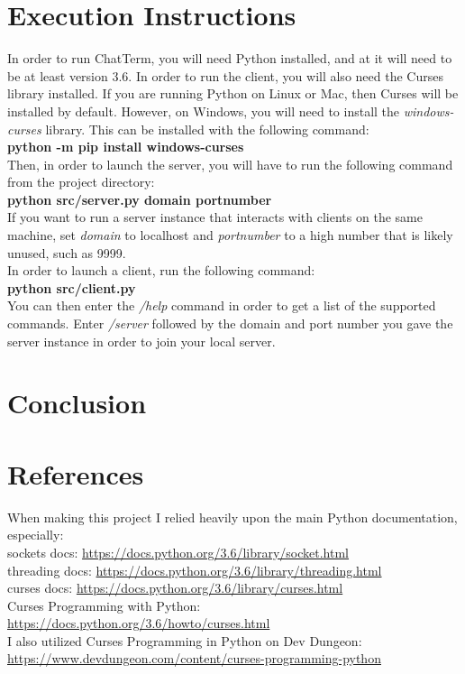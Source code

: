 \documentclass{article}
\begin{document}
    \section{Execution Instructions} 
    In order to run ChatTerm, you will need Python installed, and at it will
    need to be at least version 3.6. In order to run the client, you will also
    need the Curses library installed. If you are running Python on Linux or
    Mac, then Curses will be installed by default. However, on Windows, you will
    need to install the \emph{windows-curses} library. This can be installed
    with the following command:\\
    \textbf{python -m pip install windows-curses}\\
    Then, in order to launch the server, you will have to run the following
    command from the project directory:\\
    \textbf{python src/server.py domain portnumber}\\
    If you want to run a server instance that interacts with clients on the same
    machine, set \emph{domain} to localhost and \emph{portnumber} to a high
    number that is likely unused, such as 9999.\\
    In order to launch a client, run the following command:\\
    \textbf{python src/client.py}\\
    You can then enter the \emph{/help} command in order to get a list of the
    supported commands. Enter \emph{/server} followed by the domain and port
    number you gave the server instance in order to join your local server.
    \section{Conclusion}
    \section{References}
    When making this project I relied heavily upon the main Python
    documentation, especially:\\
    sockets docs: \url{https://docs.python.org/3.6/library/socket.html}\\
    threading docs: \url{https://docs.python.org/3.6/library/threading.html}\\
    curses docs: \url{https://docs.python.org/3.6/library/curses.html}\\
    Curses Programming with Python:
    \url{https://docs.python.org/3.6/howto/curses.html}\\
    I also utilized Curses Programming in Python on Dev Dungeon:
    \url{https://www.devdungeon.com/content/curses-programming-python}\\
\end{document}
